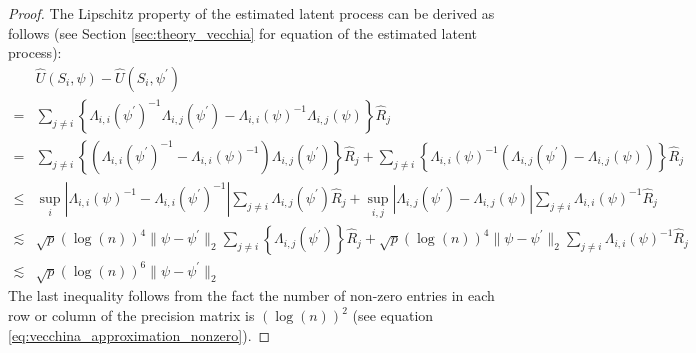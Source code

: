 \documentclass[12pt]{article}
\begin{document}
\begin{proof}
The Lipschitz property of the estimated latent process can be derived as follows (see Section \ref{sec:theory_vecchia} for equation of the estimated latent process): 
\begin{align*}
    &\widehat U(S_i,\psi)  - \widehat U(S_i,\psi^\prime )\\ =&\sum_{j\neq i}\left\{\Lambda_{i,i}(\psi^\prime)^{-1}\Lambda_{i,j}(\psi^\prime)-\Lambda_{i,i}(\psi)^{-1}\Lambda_{i,j}(\psi)\right\}\widehat{R}_{j}\\
    = & \sum_{j\neq i}\left\{(\Lambda_{i,i}(\psi^\prime)^{-1} -\Lambda_{i,i}(\psi)^{-1})\Lambda_{i,j}(\psi^\prime)\right\}\widehat{R}_{j} + \sum_{j\neq i}\left\{\Lambda_{i,i}(\psi)^{-1}(\Lambda_{i,j}(\psi^\prime)-\Lambda_{i,j}(\psi))\right\}\widehat{R}_{j}\\
    \leq & \sup_{i}\left|\Lambda_{i,i}(\psi)^{-1} -\Lambda_{i,i}(\psi^\prime)^{-1}\right| \sum_{j\neq i}\Lambda_{i,j}(\psi^\prime)\widehat R_j+ \sup_{i,j}\left|\Lambda_{i,j}(\psi^\prime)-\Lambda_{i,j}(\psi)\right|\sum_{j\neq i}\Lambda_{i,i}(\psi)^{-1}\widehat{R}_{j}\\
    \lesssim & \sqrt{p}(\log(n))^4\|\psi-\psi^\prime\|_2\sum_{j\neq i}\left\{\Lambda_{i,j}(\psi^\prime)\right\}\widehat{R}_{j} + \sqrt{p}(\log(n))^4\|\psi-\psi^\prime\|_2\sum_{j\neq i}\Lambda_{i,i}(\psi)^{-1}\widehat{R}_{j}\\
    \lesssim &\sqrt{p}(\log(n))^6\|\psi-\psi^\prime\|_2
\end{align*}
The last inequality follows from the fact the number of non-zero entries in each row or column of the precision matrix is $(\log(n))^2$ (see equation \eqref{eq:vecchina_approximation_nonzero}).

\end{proof}
\end{document}
